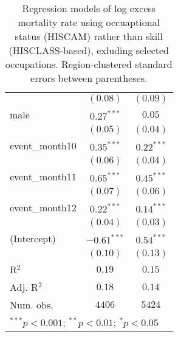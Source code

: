 \begin{table}
\begin{center}
\begin{tabular}{l c c}
                     & $(0.08)$      & $(0.09)$      \\
male                 & $0.27^{***}$  & $0.05$        \\
                     & $(0.05)$      & $(0.04)$      \\
event\_month10       & $0.35^{***}$  & $0.22^{***}$  \\
                     & $(0.06)$      & $(0.04)$      \\
event\_month11       & $0.65^{***}$  & $0.45^{***}$  \\
                     & $(0.07)$      & $(0.06)$      \\
event\_month12       & $0.22^{***}$  & $0.14^{***}$  \\
                     & $(0.04)$      & $(0.03)$      \\
(Intercept)          & $-0.61^{***}$ & $0.54^{***}$  \\
                     & $(0.10)$      & $(0.13)$      \\
\hline
R$^2$                & $0.19$        & $0.15$        \\
Adj. R$^2$           & $0.18$        & $0.14$        \\
Num. obs.            & $4406$        & $5424$        \\
\hline
\multicolumn{3}{l}{\scriptsize{$^{***}p<0.001$; $^{**}p<0.01$; $^{*}p<0.05$}}
\end{tabular}
\caption{Regression models of log excess mortality rate using occuaptional status (HISCAM) rather than skill (HISCLASS-based), exluding selected occupations. Region-clustered standard errors between parentheses.}
\label{tab:hiscammodels}
\end{center}
\end{table}
